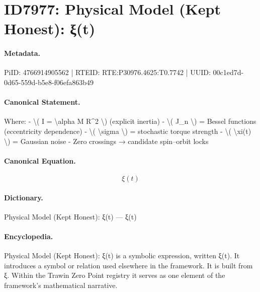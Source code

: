 \section*{ID7977: Physical Model (Kept Honest): ξ(t)}
\paragraph{Metadata.}
PiID: 4766914905562 | RTEID: RTE:P30976.4625:T0.7742 | UUID: 00c1ed7d-0d65-559d-b5e8-f06efa863b49

\paragraph{Canonical Statement.}
Where: - \textbackslash{}( I = \textbackslash{}alpha M R\textasciicircum{}2 \textbackslash{}) (explicit inertia) - \textbackslash{}( J\_n \textbackslash{}) = Bessel functions (eccentricity dependence) - \textbackslash{}( \textbackslash{}sigma \textbackslash{}) = stochastic torque strength - \textbackslash{}( \textbackslash{}xi(t) \textbackslash{}) = Gaussian noise - Zero crossings → candidate spin–orbit locks

\paragraph{Canonical Equation.}
\[
\xi(t)
\]

\paragraph{Dictionary.}
Physical Model (Kept Honest): ξ(t) — ξ(t)

\paragraph{Encyclopedia.}
Physical Model (Kept Honest): ξ(t) is a symbolic expression, written ξ(t). It introduces a symbol or relation used elsewhere in the framework. It is built from ξ. Within the Trawin Zero Point registry it serves as one element of the framework's mathematical narrative.
